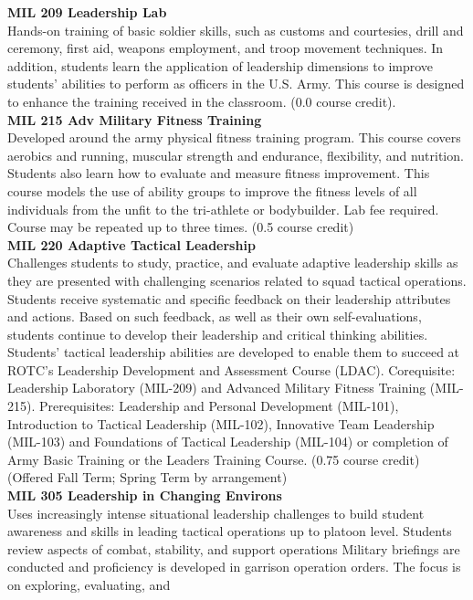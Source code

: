 \documentclass[
  letterpaper,
]{scrbook}
\begin{document}
\textbf{MIL 209 Leadership Lab}\\
Hands-on training of basic soldier skills, such as customs and
courtesies, drill and ceremony, first aid, weapons employment, and troop
movement techniques. In addition, students learn the application of
leadership dimensions to improve students' abilities to perform as
officers in the U.S. Army. This course is designed to enhance the
training received in the classroom. (0.0 course credit).\\
\textbf{MIL 215 Adv Military Fitness Training}\\
Developed around the army physical fitness training program. This course
covers aerobics and running, muscular strength and endurance,
flexibility, and nutrition. Students also learn how to evaluate and
measure fitness improvement. This course models the use of ability
groups to improve the fitness levels of all individuals from the unfit
to the tri-athlete or bodybuilder. Lab fee required. Course may be
repeated up to three times. (0.5 course credit)\\
\textbf{MIL 220 Adaptive Tactical Leadership}\\
Challenges students to study, practice, and evaluate adaptive leadership
skills as they are presented with challenging scenarios related to squad
tactical operations. Students receive systematic and specific feedback
on their leadership attributes and actions. Based on such feedback, as
well as their own self-evaluations, students continue to develop their
leadership and critical thinking abilities. Students' tactical
leadership abilities are developed to enable them to succeed at ROTC's
Leadership Development and Assessment Course (LDAC). Corequisite:
Leadership Laboratory (MIL-209) and Advanced Military Fitness Training
(MIL-215). Prerequisites: Leadership and Personal Development (MIL-101),
Introduction to Tactical Leadership (MIL-102), Innovative Team
Leadership (MIL-103) and Foundations of Tactical Leadership (MIL-104) or
completion of Army Basic Training or the Leaders Training Course. (0.75
course credit) (Offered Fall Term; Spring Term by arrangement)\\
\textbf{MIL 305 Leadership in Changing Environs}\\
Uses increasingly intense situational leadership challenges to build
student awareness and skills in leading tactical operations up to
platoon level. Students review aspects of combat, stability, and support
operations Military briefings are conducted and proficiency is developed
in garrison operation orders. The focus is on exploring, evaluating, and
\end{document}
